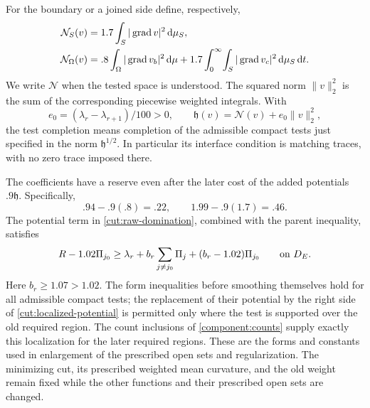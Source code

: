 \begin{definition}\label{cut:reserve}
For the boundary or a joined side define, respectively,
\begin{align*}
 \mathcal N_S(v)&=1.7\int_S|\operatorname{grad} v|^2\,\mathrm d\mu_S,\\
 \mathcal N_\Omega(v)
   &=.8\int_\Omega|\operatorname{grad} v_b|^2\,\mathrm d\mu
       +1.7\int_0^\infty\!\int_S|\operatorname{grad} v_c|^2
                                            \,\mathrm d\mu_S\,\mathrm d t.
\end{align*}
We write $\mathcal N$ when the tested space is understood.  The squared norm
$\|v\|_2^2$ is the sum of the corresponding piecewise weighted integrals.
With
\[
                  e_0=(\lambda_r-\lambda_{r+1})/100>0,
 \qquad \mathfrak h(v)=\mathcal N(v)+e_0\|v\|_2^2,
\]
the test completion means completion of the admissible compact tests
just specified in the norm $\mathfrak h^{1/2}$.  In particular its interface
condition is matching traces, with no zero trace imposed there.
\end{definition}

The coefficients have a reserve even after the later cost of the added potentials
$.9\mathfrak h$.  Specifically,
\begin{equation}\label{cut:remaining-gradient}
                       .94-.9(.8)=.22,
             \qquad 1.99-.9(1.7)=.46.
\end{equation}
The potential term in \cref{cut:raw-domination}, combined with the
parent inequality, satisfies
\begin{equation}\label{cut:localized-potential}
 R-1.02\Pi_{j_0}
 \ge\lambda_r+b_r\sum_{j\ne j_0}\Pi_j
                         +(b_r-1.02)\Pi_{j_0}
                       \qquad\hbox{on }D_E.
\end{equation}
Here $b_r\ge1.07>1.02$.  The form inequalities before smoothing themselves hold for
all admissible compact tests; the replacement of their potential by
the right side of \eqref{cut:localized-potential} is permitted only
where the test is supported over the old required region.
The count inclusions of \cref{component:counts} supply exactly this
localization for the later required regions.  These are the forms and
constants used in enlargement of the prescribed open sets and regularization.  The minimizing cut,
its prescribed weighted mean curvature, and the old weight remain fixed while the other functions
and their prescribed open sets are changed.
